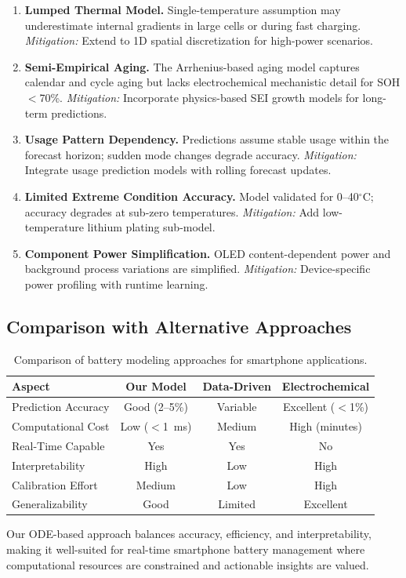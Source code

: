 \begin{enumerate}
    \item \textbf{Lumped Thermal Model.} 
    Single-temperature assumption may underestimate internal gradients in large cells or during fast charging.
    \textit{Mitigation:} Extend to 1D spatial discretization for high-power scenarios.
    
    \item \textbf{Semi-Empirical Aging.} 
    The Arrhenius-based aging model captures calendar and cycle aging but lacks electrochemical mechanistic detail for SOH $<$70\%.
    \textit{Mitigation:} Incorporate physics-based SEI growth models for long-term predictions.
    
    \item \textbf{Usage Pattern Dependency.} 
    Predictions assume stable usage within the forecast horizon; sudden mode changes degrade accuracy.
    \textit{Mitigation:} Integrate usage prediction models with rolling forecast updates.
    
    \item \textbf{Limited Extreme Condition Accuracy.} 
    Model validated for 0--40$^\circ$C; accuracy degrades at sub-zero temperatures.
    \textit{Mitigation:} Add low-temperature lithium plating sub-model.
    
    \item \textbf{Component Power Simplification.} 
    OLED content-dependent power and background process variations are simplified.
    \textit{Mitigation:} Device-specific power profiling with runtime learning.
\end{enumerate}

\subsection{Comparison with Alternative Approaches}

\begin{table}[H]
    \centering
    \caption{Comparison of battery modeling approaches for smartphone applications.}
    \label{tab:model_comparison}
    \begin{tabular}{@{}lccc@{}}
        \toprule
        \textbf{Aspect} & \textbf{Our Model} & \textbf{Data-Driven} & \textbf{Electrochemical} \\
        \midrule
        Prediction Accuracy & Good (2--5\%) & Variable & Excellent ($<$1\%) \\
        Computational Cost & Low ($<$1~ms) & Medium & High (minutes) \\
        Real-Time Capable & Yes & Yes & No \\
        Interpretability & High & Low & High \\
        Calibration Effort & Medium & Low & High \\
        Generalizability & Good & Limited & Excellent \\
        \bottomrule
    \end{tabular}
\end{table}

Our ODE-based approach balances accuracy, efficiency, and interpretability, making it well-suited for real-time smartphone battery management where computational resources are constrained and actionable insights are valued.
